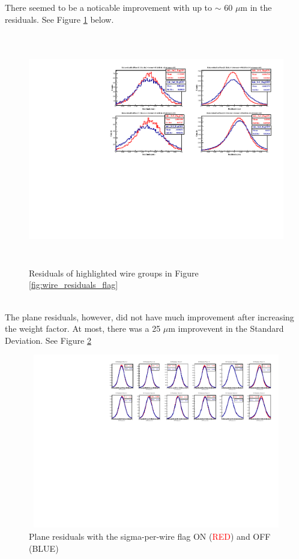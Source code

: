 \documentclass[11pt]{article}
\begin{document}
There seemed to be a noticable improvement with up to $\sim$ 60 $\mu$m in the residuals. See Figure \ref{fig:group_residuals} below.
\begin{figure}[ht!]
  \centering
  \includegraphics[width=7.0in, height=4.0in]{group_residuals.pdf}
  \caption{Residuals of highlighted wire groups in Figure \ref{fig:wire_residuals_flag}}
  \label{fig:group_residuals}
\end{figure}\\
The plane residuals, however, did not have much improvement after increasing the weight factor. At most, there was a 25 $\mu$m improvevent in the Standard Deviation.
See Figure \ref{fig:plane_residuals}
\begin{figure}[ht!]                                                          
  \centering
  \includegraphics[width=7.5in, height=3.0in]{residuals_compare.pdf}
  \caption{Plane residuals with the sigma-per-wire flag ON (\textcolor{red}{RED}) and OFF (\textcolor{navyblue}{BLUE})}
  \label{fig:plane_residuals}
\end{figure}
\end{document}
